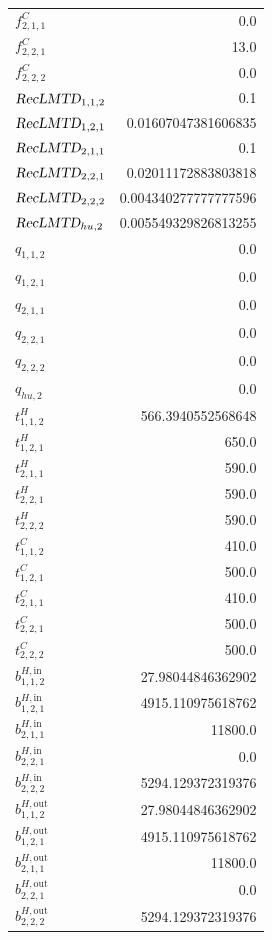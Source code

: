\documentclass{article}%
\begin{document}
\begin{multicols*}{3}
\begin{supertabular}{lr}
	$f_{2,1,1}^{C}$ & 0.0 \\%
	$f_{2,2,1}^{C}$ & 13.0 \\%
	$f_{2,2,2}^{C}$ & 0.0 \\%
	$\textsl{RecLMTD}_{1,1,2}$ & 0.1 \\%
	$\textsl{RecLMTD}_{1,2,1}$ & 0.01607047381606835 \\%
	$\textsl{RecLMTD}_{2,1,1}$ & 0.1 \\%
	$\textsl{RecLMTD}_{2,2,1}$ & 0.02011172883803818 \\%
	$\textsl{RecLMTD}_{2,2,2}$ & 0.004340277777777596 \\%
	$\textsl{RecLMTD}_{hu,2}$ & 0.005549329826813255 \\%
	$q_{1,1,2}$ & 0.0 \\%
	$q_{1,2,1}$ & 0.0 \\%
	$q_{2,1,1}$ & 0.0 \\%
	$q_{2,2,1}$ & 0.0 \\%
	$q_{2,2,2}$ & 0.0 \\%
	$q_{hu,2}$ & 0.0 \\%
	$t_{1,1,2}^{H}$ & 566.3940552568648 \\%
	$t_{1,2,1}^{H}$ & 650.0 \\%
	$t_{2,1,1}^{H}$ & 590.0 \\%
	$t_{2,2,1}^{H}$ & 590.0 \\%
	$t_{2,2,2}^{H}$ & 590.0 \\%
	$t_{1,1,2}^{C}$ & 410.0 \\%
	$t_{1,2,1}^{C}$ & 500.0 \\%
	$t_{2,1,1}^{C}$ & 410.0 \\%
	$t_{2,2,1}^{C}$ & 500.0 \\%
	$t_{2,2,2}^{C}$ & 500.0 \\%
	$b_{1,1,2}^{H,\text{in}}$ & 27.98044846362902 \\%
	$b_{1,2,1}^{H,\text{in}}$ & 4915.110975618762 \\%
	$b_{2,1,1}^{H,\text{in}}$ & 11800.0 \\%
	$b_{2,2,1}^{H,\text{in}}$ & 0.0 \\%
	$b_{2,2,2}^{H,\text{in}}$ & 5294.129372319376 \\%
	$b_{1,1,2}^{H,\text{out}}$ & 27.98044846362902 \\%
	$b_{1,2,1}^{H,\text{out}}$ & 4915.110975618762 \\%
	$b_{2,1,1}^{H,\text{out}}$ & 11800.0 \\%
	$b_{2,2,1}^{H,\text{out}}$ & 0.0 \\%
	$b_{2,2,2}^{H,\text{out}}$ & 5294.129372319376 \\%

\end{supertabular}
\end{multicols*}
\end{document}
